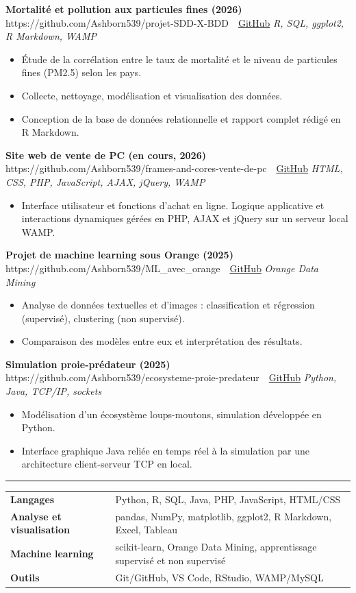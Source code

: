 \documentclass[10pt,a4paper]{article}
\newcommand{\sect}[1]{%
  \vspace{9pt}\par
  {\color{accent}\small\bfseries\textls[120]{\MakeUppercase{#1}}}\par
  \vspace{-2.5pt}
  {\color{accent}\rule{\linewidth}{0.4pt}}\par
  \vspace{3.5pt}}
\newcommand{\proj}[3]{\textbf{#1}%
  \ifx\relax#2\relax\else\ \textcolor{accent}{\textbar}\ \href{#2}{GitHub}\fi
  \hfill{\small\itshape #3}\par}
\begin{document}
\proj{Mortalité et pollution aux particules fines (2026)}{https://github.com/Ashborn539/projet-SDD-X-BDD}{R, SQL, ggplot2, R Markdown, WAMP}
\begin{itemize}
  \item Étude de la corrélation entre le taux de mortalité et le niveau de particules fines (PM2.5) selon les pays.
  \item Collecte, nettoyage, modélisation et visualisation des données.
  \item Conception de la base de données relationnelle et rapport complet rédigé en R Markdown.
\end{itemize}
\vspace{5pt}

\proj{Site web de vente de PC (en cours, 2026)}{https://github.com/Ashborn539/frames-and-cores-vente-de-pc}{HTML, CSS, PHP, JavaScript, AJAX, jQuery, WAMP}
\begin{itemize}
  \item Interface utilisateur et fonctions d'achat en ligne. Logique applicative et interactions dynamiques gérées en PHP, AJAX et jQuery sur un serveur local WAMP.
\end{itemize}
\vspace{5pt}

\proj{Projet de machine learning sous Orange (2025)}{https://github.com/Ashborn539/ML_avec_orange}{Orange Data Mining}
\begin{itemize}
  \item Analyse de données textuelles et d'images : classification et régression (supervisé), clustering (non supervisé).
  \item Comparaison des modèles entre eux et interprétation des résultats.
\end{itemize}
\vspace{5pt}

\proj{Simulation proie-prédateur (2025)}{https://github.com/Ashborn539/ecosysteme-proie-predateur}{Python, Java, TCP/IP, sockets}
\begin{itemize}
  \item Modélisation d'un écosystème loups-moutons, simulation développée en Python.
  \item Interface graphique Java reliée en temps réel à la simulation par une architecture client-serveur TCP en local.
\end{itemize}

\sect{Compétences}
\renewcommand{\arraystretch}{1.2}
\begin{tabular}{@{}p{4.8cm}@{}p{\dimexpr\linewidth-4.8cm\relax}@{}}
  \textbf{Langages} & Python, R, SQL, Java, PHP, JavaScript, HTML/CSS \\
  \textbf{Analyse et visualisation} & pandas, NumPy, matplotlib, ggplot2, R Markdown, Excel, Tableau \\
  \textbf{Machine learning} & scikit-learn, Orange Data Mining, apprentissage supervisé et non supervisé \\
  \textbf{Outils} & Git/GitHub, VS Code, RStudio, WAMP/MySQL \\
\end{tabular}
\end{document}

